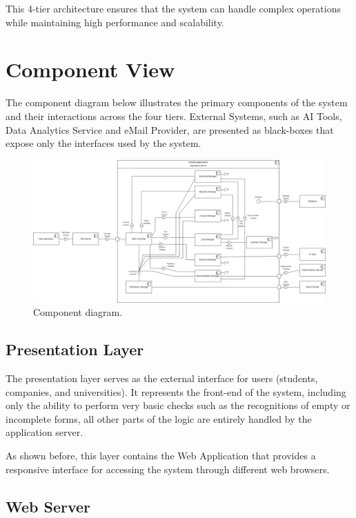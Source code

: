 This 4-tier architecture ensures that the system can handle complex operations while maintaining high performance and scalability.

\newpage

\section{Component View}
\label{sec:component_view}

The component diagram below illustrates the primary components of the system and their interactions across the four tiers. External Systems, such as AI Tools, Data Analytics Service and eMail Provider, are presented as black-boxes that expose only the interfaces used by the system. 

\begin{figure}[htbp]
    \centering
    \includegraphics[width=\linewidth]{DD/Images/Comp&Sub/LLD.png}
    \caption{Component diagram.}
    \label{fig:component_diagram}
\end{figure}


\subsection{Presentation Layer}
\label{subsec:presentation_layer}%

The presentation layer serves as the external interface for users (students, companies, and universities). It represents the front-end of the system, including only the ability to perform very basic checks such as the recognitions of empty or incomplete forms, all other parts of the logic are entirely handled by the application server.

As shown before, this layer contains the Web Application that provides a responsive interface for accessing the system through different web browsers.


\subsection{Web Server}
\label{subsec:web_server}%

